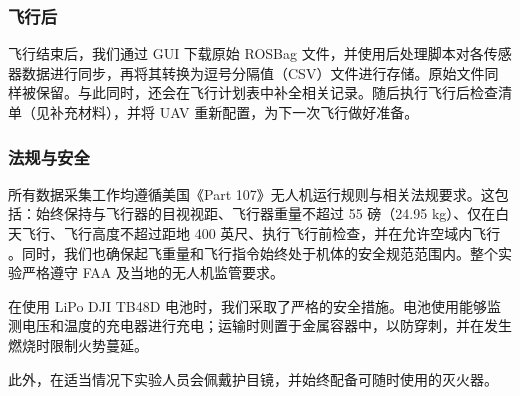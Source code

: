 \documentclass[fleqn,10pt]{wlscirep}
\begin{document}
\subsubsection*{飞行后}
飞行结束后，我们通过 GUI 下载原始 ROSBag 文件，并使用后处理脚本对各传感器数据进行同步，再将其转换为逗号分隔值（CSV）文件进行存储。原始文件同样被保留。与此同时，还会在飞行计划表中补全相关记录。随后执行飞行后检查清单（见补充材料），并将 UAV 重新配置，为下一次飞行做好准备。

\subsubsection*{法规与安全}
所有数据采集工作均遵循美国《Part 107》无人机运行规则与相关法规要求。这包括：始终保持与飞行器的目视视距、飞行器重量不超过 55 磅（24.95 kg）、仅在白天飞行、飞行高度不超过距地 400 英尺、执行飞行前检查，并在允许空域内飞行 \cite{part107}。同时，我们也确保起飞重量和飞行指令始终处于机体的安全规范范围内。整个实验严格遵守 FAA 及当地的无人机监管要求。

在使用 LiPo DJI TB48D 电池时，我们采取了严格的安全措施。电池使用能够监测电压和温度的充电器进行充电；运输时则置于金属容器中，以防穿刺，并在发生燃烧时限制火势蔓延。 

此外，在适当情况下实验人员会佩戴护目镜，并始终配备可随时使用的灭火器。
\end{document}
